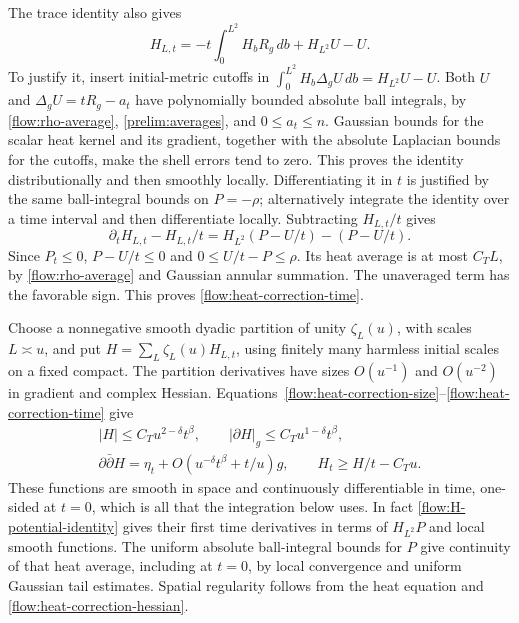 \documentclass[11pt]{article}
\theoremstyle{definition}
\theoremstyle{remark}
\newcommand{\dd}{\partial\bar\partial}
\numberwithin{equation}{section}
\begin{document}
The trace identity also gives
\begin{equation}\label{flow:H-potential-identity}
 H_{L,t}=-t\int_0^{L^2}H_bR_g\,db+H_{L^2}U-U.
\end{equation}
To justify it, insert initial-metric cutoffs in
$\int_0^{L^2}H_b\Delta_gU\,db=H_{L^2}U-U$.
Both $U$ and $\Delta_gU=tR_g-a_t$ have polynomially bounded absolute
ball integrals, by \eqref{flow:rho-average},
\eqref{prelim:averages}, and $0\le a_t\le n$.
Gaussian bounds for the scalar heat kernel and its gradient, together
with the absolute Laplacian bounds for the cutoffs, make the shell
errors tend to zero.  This proves the identity distributionally and
then smoothly locally.  Differentiating it in $t$ is justified by
the same ball-integral bounds on $P=-\rho$; alternatively integrate
the identity over a time interval and then differentiate locally.
Subtracting $H_{L,t}/t$ gives
\[
 \partial_tH_{L,t}-H_{L,t}/t
 =H_{L^2}(P-U/t)-(P-U/t).
\]
Since $P_t\le0$, $P-U/t\le0$ and $0\le U/t-P\le\rho$.
Its heat average is at most $C_TL$, by
\eqref{flow:rho-average} and Gaussian annular summation.  The
unaveraged term has the favorable sign.  This proves
\eqref{flow:heat-correction-time}.

Choose a nonnegative smooth dyadic partition of unity $\zeta_L(u)$,
with scales $L\asymp u$, and put
$H=\sum_L\zeta_L(u)H_{L,t}$, using finitely many harmless initial
scales on a fixed compact.  The partition derivatives have sizes
$O(u^{-1})$ and $O(u^{-2})$ in gradient and complex Hessian.
Equations~\eqref{flow:heat-correction-size}--\eqref{flow:heat-correction-time}
give
\begin{equation}\label{flow:glued-correction}
 \begin{gathered}
 |H|\le C_Tu^{2-\delta}t^\beta,
 \qquad |\partial H|_g\le C_Tu^{1-\delta}t^\beta,\\
 \dd H=\eta_t+O(u^{-\delta}t^\beta+t/u)g,
 \qquad H_t\ge H/t-C_Tu.
 \end{gathered}
\end{equation}
These functions are smooth in space and continuously differentiable
in time, one-sided at $t=0$, which is all that the integration below
uses.  In fact \eqref{flow:H-potential-identity} gives their first
time derivatives in terms of $H_{L^2}P$ and local smooth functions.
The uniform absolute ball-integral bounds for $P$ give continuity of
that heat average, including at $t=0$, by local convergence and
uniform Gaussian tail estimates.  Spatial regularity follows from
the heat equation and \eqref{flow:heat-correction-hessian}.
\end{document}
